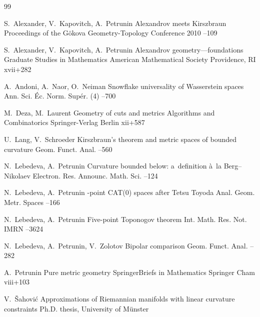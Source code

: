 \begin{thebibliography}{99}

\by S.~Alexander, V.~Kapovitch, A.~Petrunin
\paper Alexandrov meets {K}irszbraun
\inbook Proceedings of the {G}\"okova {G}eometry-{T}opology {C}onference 2010
--109

\by S.~Alexander, V.~Kapovitch, A.~Petrunin
\book Alexandrov geometry---foundations
\serial Graduate Studies in Mathematics
\publ American Mathematical Society
\publaddr Providence, RI
\totalpages xvii+282

\by A.~Andoni, A.~Naor, O.~Neiman
\paper Snowflake universality of {W}asserstein spaces
\jour Ann. Sci. \'Ec. Norm. Sup\'er. (4)
--700

\by M.~Deza, M.~Laurent
\book Geometry of cuts and metrics
\serial Algorithms and Combinatorics
\publ Springer-Verlag
\publaddr Berlin
\totalpages xii+587

\by U.~Lang, V.~Schroeder
\paper Kirszbraun's theorem and metric spaces of bounded curvature
\jour Geom. Funct. Anal.
--560

\by N.~Lebedeva, A.~Petrunin
\paper Curvature bounded below: a~definition {\`a}~la {B}erg--{N}ikolaev
\jour Electron. Res. Announc. Math. Sci.
--124

\by N.~Lebedeva, A.~Petrunin
-point {CAT(0)} spaces after {T}etsu {T}oyoda
\jour Anal. Geom. Metr. Spaces
--166

\by N.~Lebedeva, A.~Petrunin
\paper Five-point {T}oponogov theorem
\jour Int. Math. Res. Not. IMRN
--3624

\by N.~Lebedeva, A.~Petrunin, V.~Zolotov
\paper Bipolar comparison
\jour Geom. Funct. Anal.
--282

\by A.~Petrunin
\book Pure metric geometry
\serial SpringerBriefs in Mathematics
\publ Springer
\publaddr Cham
\totalpages viii+103

\by V.~\v{S}ahovi\'c
\thesis Approximations of {R}iemannian manifolds with linear curvature constraints
\thesisinfo Ph.D. thesis, University of M\"unster


\end{thebibliography}
